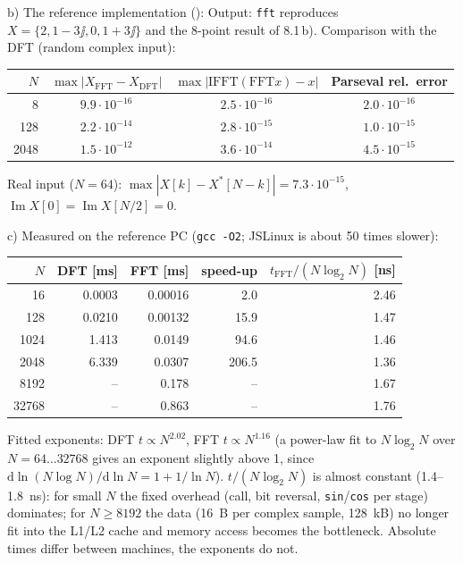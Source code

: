 \begin{solution}
b) The reference implementation
():
Output: \texttt{fft} reproduces $X=\{2,1-3\jj,0,1+3\jj\}$ and the 8-point
result of 8.1\,b). Comparison with the DFT (random complex input):
\begin{center}\small
\begin{tabular}{rccc}
\toprule
$N$ & $\max|X_\mathrm{FFT}-X_\mathrm{DFT}|$ & $\max|\mathrm{IFFT}(\mathrm{FFT}x)-x|$ & Parseval rel.\ error\\
\midrule
8 & $9.9\cdot10^{-16}$ & $2.5\cdot10^{-16}$ & $2.0\cdot10^{-16}$\\
128 & $2.2\cdot10^{-14}$ & $2.8\cdot10^{-15}$ & $1.0\cdot10^{-15}$\\
2048 & $1.5\cdot10^{-12}$ & $3.6\cdot10^{-14}$ & $4.5\cdot10^{-15}$\\
\bottomrule
\end{tabular}
\end{center}
Real input ($N=64$): $\max|X[k]-X^*[N-k]|=7.3\cdot10^{-15}$,
$\operatorname{Im}X[0]=\operatorname{Im}X[N/2]=0$.

c) Measured on the reference PC (\texttt{gcc -O2}; JSLinux is about 50 times slower):
\begin{center}\small
\begin{tabular}{rrrrr}
\toprule
$N$ & DFT [ms] & FFT [ms] & speed-up & $t_\mathrm{FFT}/(N\log_2N)$ [ns]\\
\midrule
16 & 0.0003 & 0.00016 & 2.0 & 2.46\\
128 & 0.0210 & 0.00132 & 15.9 & 1.47\\
1024 & 1.413 & 0.0149 & 94.6 & 1.46\\
2048 & 6.339 & 0.0307 & 206.5 & 1.36\\
8192 & -- & 0.178 & -- & 1.67\\
32768 & -- & 0.863 & -- & 1.76\\
\bottomrule
\end{tabular}
\end{center}
Fitted exponents: DFT $t\propto N^{2.02}$, FFT $t\propto N^{1.16}$ (a power-law fit
to $N\log_2N$ over $N=64\dots32768$ gives an exponent slightly above 1, since
$\mathrm d\ln(N\log N)/\mathrm d\ln N=1+1/\ln N$). $t/(N\log_2N)$ is almost
constant (\SI{1.4}{}--\SI{1.8}{ns}): for small $N$ the fixed overhead (call,
bit reversal, \texttt{sin}/\texttt{cos} per stage) dominates; for
$N\ge8192$ the data (\SI{16}{B} per complex sample, \SI{128}{kB}) no longer fit
into the L1/L2 cache and memory access becomes the bottleneck. Absolute
times differ between machines, the exponents do not.


\end{solution}
